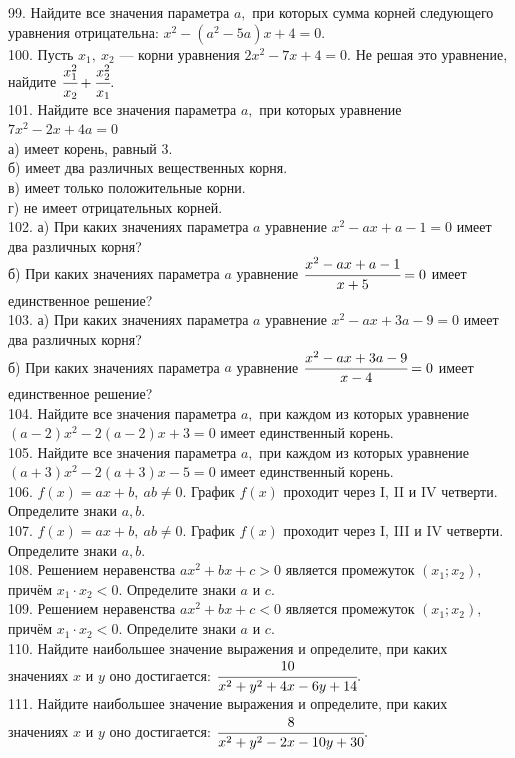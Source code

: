 \documentclass[12pt]{article}
\begin{document}
99. Найдите все значения параметра $a,$ при которых сумма корней следующего уравнения отрицательна: $x^2-(a^2-5a)x+4=0.$\\
100. Пусть $x_1,\ x_2$ --- корни уравнения $2x^2-7x+4=0.$ Не решая это уравнение, найдите $\cfrac{x_1^2}{x_2}+\cfrac{x_2^2}{x_1}.$\\
101. Найдите все значения параметра $a,$ при которых уравнение $7x^2-2x+4a=0$\\
а) имеет корень, равный 3.\\
б) имеет два различных вещественных корня.\\
в) имеет только положительные корни.\\
г) не имеет отрицательных корней.\\
102. а) При каких значениях параметра $a$ уравнение $x^2-ax+a-1=0$ имеет два различных корня?\\
б) При каких значениях параметра $a$ уравнение $\cfrac{x^2-ax+a-1}{x+5}=0$ имеет единственное решение?\\
103. а) При каких значениях параметра $a$ уравнение $x^2-ax+3a-9=0$ имеет два различных корня?\\
б) При каких значениях параметра $a$ уравнение $\cfrac{x^2-ax+3a-9}{x-4}=0$ имеет единственное решение?\\
104. Найдите все значения параметра $a,$ при каждом из которых уравнение
$(a - 2)x^2 - 2(a - 2)x + 3 = 0$ имеет единственный корень.\\
105. Найдите все значения параметра $a,$ при каждом из которых уравнение
$(a + 3)x^2 - 2(a + 3)x - 5 = 0$ имеет единственный корень.\\
106. $f(x)=ax+b,\ ab\neq 0.$ График $f(x)$ проходит через I, II и IV четверти. Определите знаки $a,b.$\\
107. $f(x)=ax+b,\ ab\neq 0.$ График $f(x)$ проходит через I, III и IV четверти. Определите знаки $a,b.$\\
108. Решением неравенства $ax^2 + bx + c > 0$ является промежуток $(x_1; x_2),$ причём $x_1\cdot x_2 <  0.$ Определите знаки $a$ и $c.$\\
109. Решением неравенства $ax^2 + bx + c < 0$ является промежуток $(x_1; x_2),$ причём $x_1\cdot x_2 <  0.$ Определите знаки $a$ и $c.$\\
110. Найдите наибольшее значение выражения и определите, при каких значениях $x$ и $y$ оно достигается: $\cfrac{10}{x^2+y^2+4x-6y+14}.$\\
111. Найдите наибольшее значение выражения и определите, при каких значениях $x$ и $y$ оно достигается: $\cfrac{8}{x^2+y^2-2x-10y+30}.$\\
\end{document}
